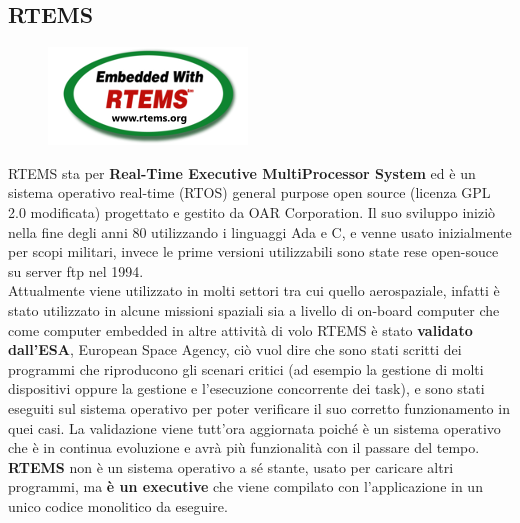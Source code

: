 \documentclass[12pt, a4paper, titlepage, oneside]{book}
\begin{document}
\begin{flushleft}
\section{RTEMS}
\begin{figure}[h]
    \centering
    \includegraphics[scale = 2]{rtemslogo.png}
\end{figure}
RTEMS sta per\textbf{ Real-Time Executive MultiProcessor System} ed è un sistema operativo real-time (RTOS) general purpose open source (licenza GPL 2.0 modificata) progettato e gestito da OAR Corporation. Il suo sviluppo iniziò nella fine degli anni 80 utilizzando i linguaggi Ada e C, e venne usato inizialmente per scopi militari, invece le prime versioni utilizzabili sono state rese open-souce su server ftp nel 1994.\\
Attualmente viene utilizzato in molti settori tra cui quello aerospaziale, infatti è stato utilizzato in alcune missioni spaziali sia a livello di on-board computer che come computer embedded in altre attività di volo
RTEMS è  stato\textbf{ validato dall'ESA}, European Space Agency, ciò vuol dire che sono stati scritti dei programmi che riproducono gli scenari critici (ad esempio la gestione di molti dispositivi oppure la gestione e l'esecuzione concorrente dei task), e sono stati eseguiti sul sistema operativo per poter verificare il suo corretto funzionamento in quei casi. La validazione viene tutt'ora aggiornata poiché è un sistema operativo che è in continua evoluzione e avrà più funzionalità con il passare del tempo.\\
\textbf{RTEMS} non è un sistema operativo a sé stante, usato per caricare altri programmi, ma \textbf{è un executive} che viene compilato con l'applicazione in un unico codice monolitico da eseguire.


\end{flushleft}
\end{document}
